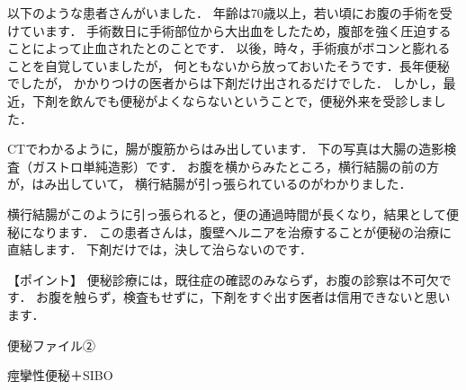以下のような患者さんがいました．
年齢は70歳以上，若い頃にお腹の手術を受けています．
手術数日に手術部位から大出血をしたため，腹部を強く圧迫することによって止血されたとのことです．
以後，時々，手術痕がボコンと膨れることを自覚していましたが，
何ともないから放っておいたそうです．長年便秘でしたが，
かかりつけの医者からは下剤だけ出されるだけでした．
しかし，最近，下剤を飲んでも便秘がよくならないということで，便秘外来を受診しました． 



CTでわかるように，腸が腹筋からはみ出しています．
下の写真は大腸の造影検査（ガストロ単純造影）です．
お腹を横からみたところ，横行結腸の前の方が，はみ出していて，
横行結腸が引っ張られているのがわかりました． 



横行結腸がこのように引っ張られると，便の通過時間が長くなり，結果として便秘になります．
この患者さんは，腹壁ヘルニアを治療することが便秘の治療に直結します．
下剤だけでは，決して治らないのです．

【ポイント】
便秘診療には，既往症の確認のみならず，お腹の診察は不可欠です．
お腹を触らず，検査もせずに，下剤をすぐ出す医者は信用できないと思います．

便秘ファイル②

痙攣性便秘＋SIBO


